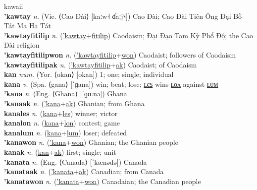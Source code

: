 kawaii \label{'kawai} \\
\textbf{'kawtay} \textit{n.} (Vie. ⟨Cao Đài⟩ [kaːw˧ ɗaːj˦˨])
Cao Đài; Cao Đài Tiên Ông Đại Bồ Tát Ma Ha Tát \label{'kawtay} \\
\textbf{'kawtayfitilip} \textit{n.} (\hyperref['kawtay]{'kawtay}+\hyperref[fitilip]{fitilip})
Caodaism; Đại Đạo Tam Kỳ Phổ Độ; the Cao Đài religion \label{'kawtayfitilip} \\
\textbf{'kawtayfitilipwon} \textit{n.} (\hyperref['kawtayfitilip]{'kawtayfitilip}+\hyperref[won]{won})
Caodaist; followers of Caodaism \label{'kawtayfitilipwon} \\
\textbf{'kawtayfitilipak} \textit{n.} (\hyperref['kawtayfitilip]{'kawtayfitilip}+\hyperref[ak]{ak})
Caodaist; of Caodaism \label{'kawtayfitilipak} \\
\textbf{kan} \textit{num.} (Yor. ⟨okan⟩ [okan])
1; one; single; individual \label{kan} \\
\textbf{kana} \textit{v.} (Spa. ⟨gana⟩ [ˈɡana])
win; beat; lose; \hyperref[kanales]{ʟєꜱ} wins \hyperref[kanalon]{ʟᴏᴧ} against \hyperref[kanalum]{ʟᴜᴍ} \label{kana} \\
\textbf{'kana} \textit{n.} (Eng. ⟨Ghana⟩ [ˈɡɑːnə])
Ghana \label{'kana} \\
\textbf{'kanaak} \textit{n.} (\hyperref['kana]{'kana}+\hyperref[ak]{ak})
Ghanian; from Ghana \label{'kanaak} \\
\textbf{kanales} \textit{n.} (\hyperref[kana]{kana}+\hyperref[les]{les})
winner; victor \label{kanales} \\
\textbf{kanalon} \textit{n.} (\hyperref[kana]{kana}+\hyperref[lon]{lon})
contest; game \label{kanalon} \\
\textbf{kanalum} \textit{n.} (\hyperref[kana]{kana}+\hyperref[lum]{lum})
loser; defeated \label{kanalum} \\
\textbf{'kanawon} \textit{n.} (\hyperref['kana]{'kana}+\hyperref[won]{won})
Ghanian; the Ghanian people \label{'kanawon} \\
\textbf{kanak} \textit{n.} (\hyperref[kan]{kan}+\hyperref[ak]{ak})
first; single; unit \label{kanak} \\
\textbf{'kanata} \textit{n.} (Eng. ⟨Canada⟩ [ˈkænədə])
Canada \label{'kanata} \\
\textbf{'kanataak} \textit{n.} (\hyperref['kanata]{'kanata}+\hyperref[ak]{ak})
Canadian; from Canada \label{'kanataak} \\
\textbf{'kanatawon} \textit{n.} (\hyperref['kanata]{'kanata}+\hyperref[won]{won})
Canadaian; the Canadian people \label{'kanatawon} \\
